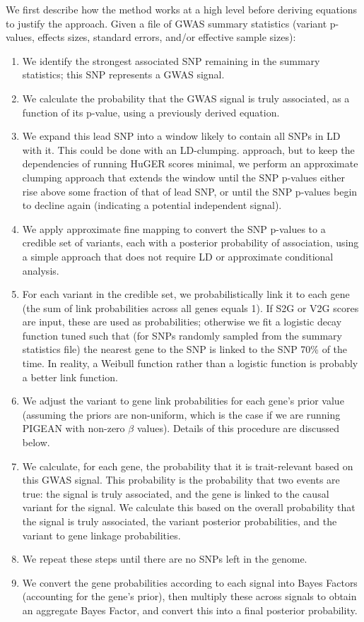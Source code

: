 We first describe how the method works at a high level before deriving
equations to justify the approach. Given a file of GWAS summary
statistics (variant p-values, effects sizes, standard errors, and/or
effective sample sizes):
\begin{enumerate}
  \item We identify the strongest associated SNP remaining in the
    summary statistics; this SNP represents a GWAS signal.
  \item We calculate the probability that the GWAS signal is truly
    associated, as a function of its p-value, using a previously
    derived equation\cite{Wakefield}.
  \item We expand this lead SNP into a window likely to contain all SNPs in
    LD with it. This could be done with an LD-clumping.
    approach\cite{}, but to keep the dependencies of running HuGER
    scores minimal, we perform an approximate clumping approach that
    extends the window until the SNP p-values either rise above some fraction
    of that of lead SNP, or until the SNP p-values begin to decline
    again (indicating a potential independent signal).
  \item We apply approximate fine mapping to convert the SNP p-values
    to a credible set of variants, each with a posterior probability of association\cite{}, using a simple
    approach that does not require LD or approximate conditional
    analysis.
    \item For each variant in the credible set, we probabilistically
      link it to each gene (the sum of link probabilities across all
      genes equals 1). If S2G\cite{} or V2G\cite{} scores are input,
      these are used as probabilities; otherwise we fit a logistic
      decay function tuned such that (for SNPs randomly sampled from
      the summary statistics file) the nearest gene to the SNP is
      linked to the SNP 70\% of the time. In reality, a Weibull
      function rather than a logistic function is probably a better
      link function.
  \item We adjust the variant to gene link probabilities for each
    gene's prior value (assuming the priors are non-uniform, which is
    the case if we are running PIGEAN with non-zero $\beta$
    values). Details of this procedure are discussed below.
  \item We calculate, for each gene, the probability that it is
    trait-relevant based on this GWAS signal. This probability is the
    probability that two events are true: the signal is truly
    associated, and the gene is linked to the causal variant for the
    signal. We calculate this based on the overall probability that
    the signal is truly associated, the
    variant posterior probabilities, and the variant to gene linkage
    probabilities.
  \item We repeat these steps until there are no SNPs left in the
    genome.
  \item We convert the gene probabilities according to each signal
    into Bayes Factors (accounting for the gene's prior), then
    multiply these across signals to obtain an aggregate Bayes Factor,
    and convert this into a final posterior probability.
\end{enumerate}

